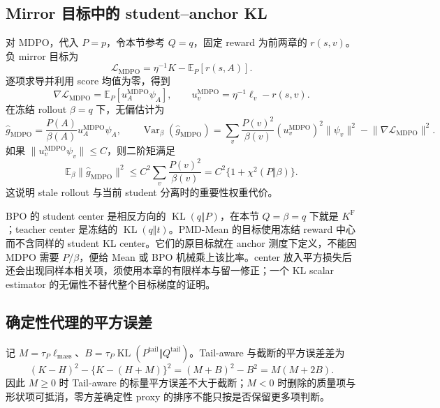 \documentclass[lang=cn,scheme=chinese,openany]{../book/elegantbook}
\newcommand{\E}{\mathbb E}
\newcommand{\KL}{\operatorname{KL}}
\newcommand{\Var}{\operatorname{Var}}
\newcommand{\tail}{\mathrm{tail}}
\begin{document}
\subsection{Mirror 目标中的 student--anchor KL}

对 MDPO，代入 $P=p$，令本节参考 $Q=q$，固定 reward 为前两章的 $r(s,v)$。负 mirror 目标为
\begin{equation*}
 \mathcal L_{\mathrm{MDPO}}
 =\eta^{-1}K-\E_P[r(s,A)].
\end{equation*}
逐项求导并利用 score 均值为零，得到
\begin{equation*}
 \nabla\mathcal L_{\mathrm{MDPO}}
 =\E_P[u_A^{\mathrm{MDPO}}\psi_A],\qquad
 u_v^{\mathrm{MDPO}}=\eta^{-1}\ell_v-r(s,v).
\end{equation*}
在冻结 rollout $\beta=q$ 下，无偏估计为
\begin{equation*}
 \widehat g_{\mathrm{MDPO}}=\frac{P(A)}{\beta(A)}u_A^{\mathrm{MDPO}}\psi_A,\qquad
 \Var_\beta(\widehat g_{\mathrm{MDPO}})
 =\sum_v\frac{P(v)^2}{\beta(v)}(u_v^{\mathrm{MDPO}})^2\lVert \psi_v\rVert^2
  -\lVert\nabla\mathcal L_{\mathrm{MDPO}}\rVert^2.
\end{equation*}
如果 $\lVert u_v^{\mathrm{MDPO}}\psi_v\rVert\leq C$，则二阶矩满足
\begin{equation}
 \E_\beta\lVert\widehat g_{\mathrm{MDPO}}\rVert^2
 \leq C^2\sum_v\frac{P(v)^2}{\beta(v)}
 =C^2\{1+\chi^2(P\Vert\beta)\}.
 \label{est:eq:mdpo-variance}
\end{equation}
这说明 stale rollout 与当前 student 分离时的重要性权重代价。

BPO 的 student center 是相反方向的 $\KL(q\Vert P)$，在本节 $Q=\beta=q$ 下就是 $K^{\mathrm F}$；teacher center 是冻结的 $\KL(q\Vert t)$。PMD-Mean 的目标使用冻结 reward 中心而不含同样的 student KL center。它们的原目标就在 anchor 测度下定义，不能因 MDPO 需要 $P/\beta$，便给 Mean 或 BPO 机械乘上该比率。center 放入平方损失后还会出现同样本相关项，须使用本章的有限样本与留一修正；一个 KL scalar estimator 的无偏性不替代整个目标梯度的证明。

\subsection{确定性代理的平方误差}

记 $M=\tau_P\ell_{\mathrm{mass}}$、$B=\tau_P\KL(P^{\tail}\Vert Q^{\tail})$。Tail-aware 与截断的平方误差差为
\begin{equation*}
 (K-H)^2-\{K-(H+M)\}^2=(M+B)^2-B^2=M(M+2B).
\end{equation*}
因此 $M\geq0$ 时 Tail-aware 的标量平方误差不大于截断；$M<0$ 时删除的质量项与形状项可抵消，零方差确定性 proxy 的排序不能只按是否保留更多项判断。
\end{document}
